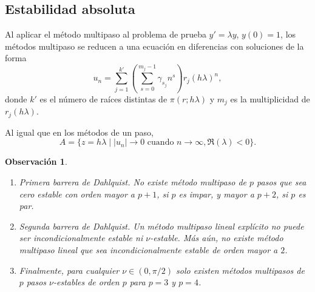 \documentclass[11pt,letterpaper]{article}
\newtheorem{remark}{Observación}
\begin{document}
\subsection{Estabilidad absoluta}
Al aplicar el método multipaso al problema de prueba $y'=\lambda y$,
$y(0)=1$, los métodos multipaso se reducen a una ecuación en
diferencias con soluciones de la forma
\begin{equation}
  u_n = \sum_{j=1}^{k'}
  \left(
    \sum_{s=0}^{m_j-1} \gamma_{s_j} n^{s}
  \right)
  r_{j}(h\lambda)^n
,\end{equation}
donde $k'$ es el número de raíces distintas de $\pi(r;h\lambda)$ y
$m_j$ es la multiplicidad de $r_j(h\lambda)$.

Al igual que en los métodos de un paso,
\begin{equation}
  A 
  = \{
    z=h\lambda
  \mid
  |u_n|\to 0 \text{ cuando } n\to \infty,
  \Re(\lambda)<0
\}
.\end{equation}

\begin{remark}
  \begin{enumerate}
    \item
      Primera barrera de Dahlquist.
      No existe método multipaso de $p$ pasos que sea cero estable con
      orden mayor a $p+1$, si $p$ es impar, y mayor a $p+2$, si $p$ es
      par.
    \item
      Segunda barrera de Dahlquist. Un método multipaso lineal
      explícito no puede ser incondicionalmente estable ni
      $\nu$-estable. Más aún, no existe método multipaso lineal que
      sea incondicionalmente estable de orden mayor a $2$.
    \item
      Finalmente, para cualquier $\nu\in(0,\pi / 2)$ solo existen
      métodos multipasos de $p$ pasos $\nu$-estables de orden $p$ para
      $p=3$ y $p=4$.
  \end{enumerate}
\end{remark}
\end{document}
